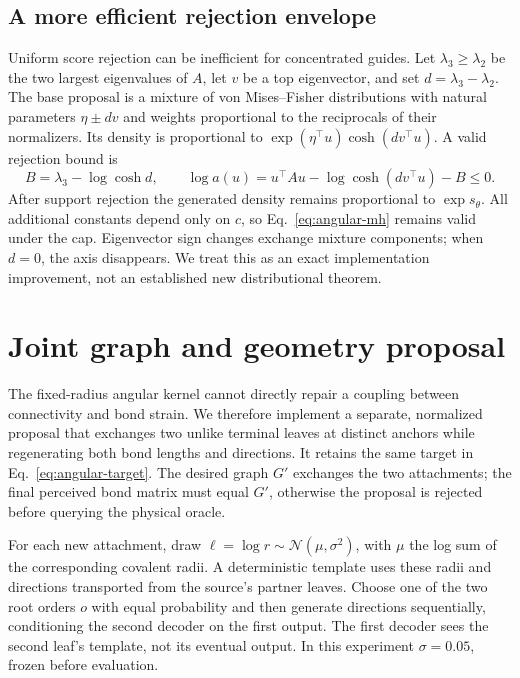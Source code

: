 \subsection{A more efficient rejection envelope}
Uniform score rejection can be inefficient for concentrated guides. Let
$\lambda_3\ge\lambda_2$ be the two largest eigenvalues of $A$, let $v$ be a top
eigenvector, and set $d=\lambda_3-\lambda_2$. The base proposal is a mixture of
von Mises--Fisher distributions with natural parameters $\eta\pm d v$ and weights
proportional to the reciprocals of their normalizers. Its density is proportional
to $\exp(\eta^\top u)\cosh(d v^\top u)$. A valid rejection bound is
\begin{equation}
 B=\lambda_3-\log\cosh d,\qquad
 \log a(u)=u^\top A u-\log\cosh(d v^\top u)-B\le 0.
\end{equation}
After support rejection the generated density remains proportional to
$\exp s_\theta$. All additional constants depend only on $c$, so
Eq.~\eqref{eq:angular-mh} remains valid under the cap. Eigenvector sign changes
exchange mixture components; when $d=0$, the axis disappears. We treat this as
an exact implementation improvement, not an established new distributional theorem.

\section{Joint graph and geometry proposal}
The fixed-radius angular kernel cannot directly repair a coupling between
connectivity and bond strain. We therefore implement a separate, normalized
proposal that exchanges two unlike terminal leaves at distinct anchors while
regenerating both bond lengths and directions. It retains the same target in
Eq.~\eqref{eq:angular-target}. The desired graph $G'$ exchanges the two attachments;
the final perceived bond matrix must equal $G'$, otherwise the proposal is rejected
before querying the physical oracle.

For each new attachment, draw $\ell=\log r\sim\mathcal N(\mu,\sigma^2)$, with
$\mu$ the log sum of the corresponding covalent radii. A deterministic template
uses these radii and directions transported from the source's partner leaves.
Choose one of the two root orders $o$ with equal probability and then generate
directions sequentially, conditioning the second decoder on the first output.
The first decoder sees the second leaf's template, not its eventual output.
In this experiment $\sigma=0.05$, frozen before evaluation.

